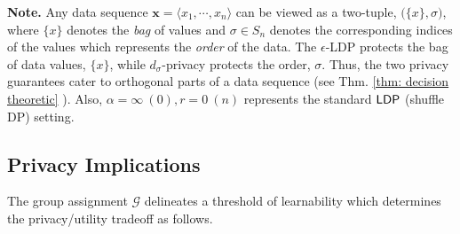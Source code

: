 \textbf{Note.} Any data sequence $\mathbf{x}=\langle x_1,\cdots, x
_n\rangle$ can be viewed as a two-tuple,  $\big(\{x\}, \sigma\big)$, where $\{x\}$ denotes the \textit{bag} of values and $\sigma \in S_n$ denotes the corresponding indices of the values which represents the \textit{order} of the data.
 The $\epsilon$-LDP protects the bag of data values, $\{x\}$, while $d_\sigma$-privacy protects the order, $\sigma$. Thus, the two privacy guarantees cater to orthogonal parts of a data sequence (see Thm. \ref{thm: decision theoretic} ). Also, $\alpha=\infty~(0), r = 0~(n)$ represents the standard $\textsf{LDP}~$(shuffle \textsf{DP}) setting.
 



 \vspace{-1em}
\subsection{Privacy Implications}
\label{sec:privacy:implications}
\vspace{-0.2cm} 
The group assignment $\mathcal{G}$ delineates a threshold of learnability which determines the privacy/utility tradeoff as follows.


